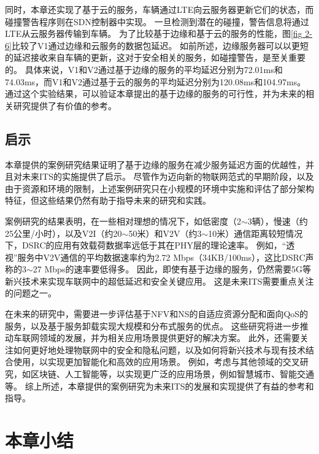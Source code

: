 同时，本章还实现了基于云的服务，车辆通过LTE向云服务器更新它们的状态，而碰撞警告程序则在SDN控制器中实现。
一旦检测到潜在的碰撞，警告信息将通过LTE从云服务器传输到车辆。
为了比较基于边缘和基于云的服务的性能，图\ref{fig 2-6}比较了V1通过边缘和云服务的数据包延迟。
如前所述，边缘服务器可以以更短的延迟接收来自车辆的更新，这对于安全相关的服务，如碰撞警告，是至关重要的。
具体来说，V1和V2通过基于边缘的服务的平均延迟分别为72.01ms和74.03ms，而V1和V2通过基于云的服务的平均延迟分别为120.08ms和104.97ms。
通过这个实验结果，可以验证本章提出的基于边缘的服务的可行性，并为未来的相关研究提供了有价值的参考。

\subsection{启示}

本章提供的案例研究结果证明了基于边缘的服务在减少服务延迟方面的优越性，并且对未来ITS的实施提供了启示。
尽管作为迈向新的物联网范式的早期阶段，以及由于资源和环境的限制，上述案例研究只在小规模的环境中实施和评估了部分架构特征，但这些结果仍然有助于指导未来的研究和实践。

案例研究的结果表明，在一些相对理想的情况下，如低密度（2$\sim$3辆），慢速（约25公里/小时），以及V2I（约20$\sim$50米）和V2V（约3$\sim$10米）通信距离较短情况下，DSRC的应用有效载荷数据率远低于其在PHY层的理论速率。
例如，“透视”服务中V2V通信的平均数据速率约为2.72 Mbps（34KB/100ms），这比DSRC声称的3$\sim$27 Mbps的速率要低得多。
因此，即使有基于边缘的服务，仍然需要5G等新兴技术来实现车联网中的超低延迟和安全关键应用。
这是未来ITS需要重点关注的问题之一。

在未来的研究中，需要进一步评估基于NFV和NS的自适应资源分配和面向QoS的服务，以及基于服务卸载实现大规模和分布式服务的优点。
这些研究将进一步推动车联网领域的发展，并为相关应用场景提供更好的解决方案。
此外，还需要关注如何更好地处理物联网中的安全和隐私问题，以及如何将新兴技术与现有技术结合使用，以实现更加智能化和高效的应用场景。
例如，考虑与其他领域的交叉研究，如区块链、人工智能等，以实现更广泛的应用场景，例如智慧城市、智能交通等。
综上所述，本章提供的案例研究为未来ITS的发展和实现提供了有益的参考和指导。

\section{本章小结}\label{section 2-5}

